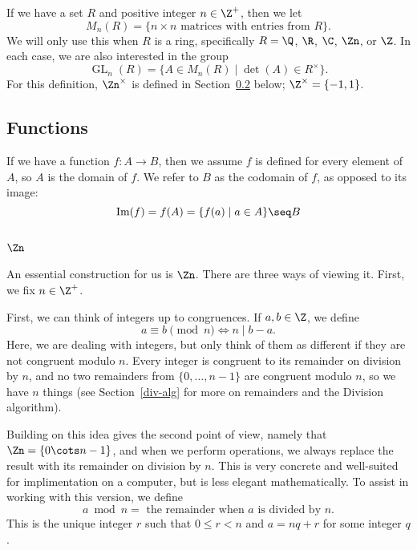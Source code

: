 \documentclass[12pt]{amsart}
\DeclareMathOperator{\GL}{GL}
\theoremstyle{plain}
\theoremstyle{definition}
\theoremstyle{remark}
\begin{document}
If we have a set $R$ and positive integer $n\in\Z^+$, then we let
\[ M_n(R)=\{n\times n \text{ matrices with entries from $R$}\}.\]
We will only use this when $R$ is a ring, specifically $R=\Q$, $\R$,
$\C$, $\Zn$, or $\Z$.  
In each case, we are also interested in the group
\[ \GL_n(R) =\{A\in M_n(R)\mid \det(A)\in R^\times\}.\] 
For this definition, $\Zn^\times$ is defined in Section~\ref{zn}
below; $\Z^\times=\{-1,1\}$.

\subsection{Functions}
If we have a function $f:A\to B$, then we assume $f$ is defined for
every element of $A$, so $A$ is the domain of $f$.  We refer to $B$ as
the codomain of $f$, as opposed to its image:
\[ \text{Im}(f)=f(A) = \{f(a)\mid a\in A\}\seq B\]

\subsection{$\Zn$}
\label{zn}
An essential construction for us is $\Zn$.  There are three ways of
viewing it.  First, we fix $n\in\Z^+$.

First, we can think of integers up to congruences.  If $a,b\in \Z$, we
define
\[ a\equiv b\pmod n \iff n\mid b-a.\]
Here, we are dealing with integers, but only think of them as
different if they are not congruent modulo $n$.  Every integer is
congruent to its remainder on division by $n$, and no two remainders
from $\{0,\ldots, n-1\}$ are congruent modulo $n$, so we have $n$
things (see Section~\ref{div-alg} for more on remainders and the
Division algorithm).

Building on this idea gives the second point of view, namely that
$\Zn=\{0\cots n-1\}$, and when we perform operations, we always
replace the result with its remainder on division by $n$.  This is
very concrete and well-suited for implimentation on a computer, but is
less elegant mathematically.  To assist in working with this version,
we define
\[ a\bmod n = \text{ the remainder when $a$ is divided by $n$}.\]
This is the unique integer $r$ such that $0\leq r<n$ and $a=nq+r$ for
some integer $q$.
\end{document}
